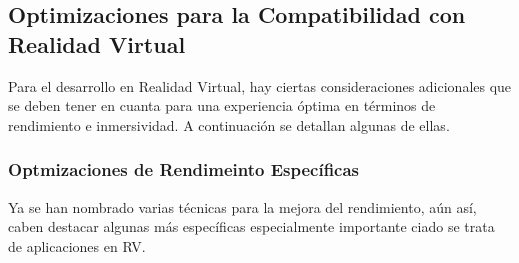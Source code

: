           
        \subsection{Optimizaciones para la Compatibilidad con Realidad Virtual}

            Para el desarrollo en Realidad Virtual, hay ciertas consideraciones adicionales que se deben tener en cuanta para una experiencia óptima en términos de rendimiento e inmersividad. A continuación se detallan algunas de ellas.
            
            \subsubsection{Optmizaciones de Rendimeinto Específicas}
            Ya se han nombrado varias técnicas para la mejora del rendimiento, aún así, caben destacar algunas más específicas especialmente importante ciado se trata de aplicaciones en RV. \cite{fastercapital} \cite{linkedinoptimization}

